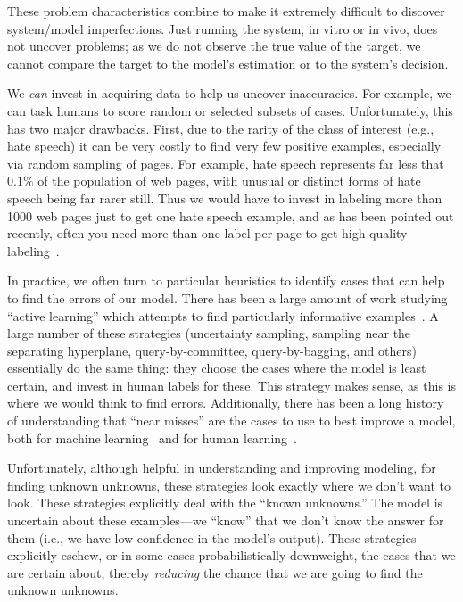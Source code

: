 These problem characteristics combine to make it extremely difficult to
discover system/model imperfections.  Just running the system, in
vitro or in vivo, does not uncover problems; as we do not observe
the true value of the target, we cannot compare the target to the model's
estimation or to the system's decision.

We \textit{can} invest in acquiring data to help us uncover
inaccuracies.  For example, we can task humans to score random or
selected subsets of cases.  Unfortunately, this has two major
drawbacks.  First, due to the rarity of the class of interest (e.g.,
hate speech) it can be very costly to find very few positive examples,
especially via random sampling of pages.  For example, hate speech
represents far less that $0.1\%$ of the population of web pages, with unusual or distinct forms of hate speech being far rarer still. Thus we would
have to invest in labeling more than 1000 web pages just to get one hate speech
example, and as has been pointed out
recently, often you need more than one label per page to get
high-quality labeling~\cite{shengKDD2008,raykar2009supervised}.




In practice, we often turn to particular heuristics to identify
cases that can help to find the errors of our model.  There has been a
large amount of work studying ``active learning'' which attempts to
find particularly informative examples~\cite{SettlesActiveLearning}.
A large number of these strategies (uncertainty sampling, sampling
near the separating hyperplane, query-by-committee, query-by-bagging,
and others) essentially do the same thing: they choose the cases where
the model is least certain, and invest in human labels for these.
This strategy makes sense, as this is where we would think to find
errors.  Additionally, there has been a long history of understanding that
``near misses'' are the cases to use to best improve a model, both for
machine learning~\cite{winston1970learning} and for human
learning~\cite{vanlehn1998analogy}.

Unfortunately, although helpful in understanding and improving
modeling, for finding unknown unknowns, 
these strategies look exactly where we don't want to look.
These strategies explicitly deal with the ``known unknowns.''  The
model is uncertain about these examples---we ``know'' that we don't
know the answer for them (i.e., we have low confidence in the model's
output).  These strategies explicitly eschew, or in some cases
probabilistically downweight, the cases that we are
certain about, thereby \textit{reducing} the chance that we are going
to find the unknown unknowns.

